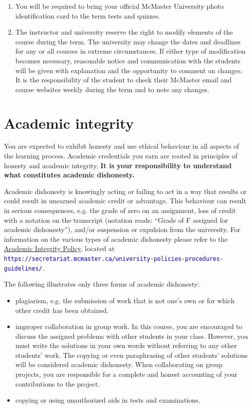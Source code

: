 \documentclass[12pt]{article}
\newcommand{\url}[1]{{\tt\textcolor{blue}{#1}}}
\begin{document}
\begin{center}
\begin{enumerate}
\item You will be required to bring your official McMaster University photo identification card to the term tests and quizzes.

\item The instructor and university reserve the right to modify elements of the course during the term.  The university may change the dates and deadlines for any or all courses in extreme circumstances.  If either type of modification becomes necessary, reasonable notice and communication with the students will be given with explanation and the opportunity to comment on changes.  It is the responsibility of the student to check their McMaster email and course websites weekly during the term and to note any changes.

\end{enumerate}

\section*{Academic integrity}

You are expected to exhibit honesty and use ethical behaviour in all
aspects of the learning process. Academic credentials you earn are
rooted in principles of honesty and academic integrity. \textbf{It is
your responsibility to understand what constitutes academic dishonesty.}

Academic dishonesty is knowingly acting or failing to act in a way that results or could result in unearned academic credit or advantage. This behaviour can result in serious consequences, e.g. the grade of zero on an assignment, loss of credit with a notation on the transcript (notation reads: ``Grade of F assigned for academic dishonesty''), and/or suspension or expulsion from the university. For information on the various types of academic dishonesty please refer to the \href{https://secretariat.mcmaster.ca/app/uploads/Academic-Integrity-Policy-1-1.pdf}{Academic Integrity Policy}, located at \url{https://secretariat.mcmaster.ca/university-policies-procedures-guidelines/}.

The following illustrates only three forms of academic dishonesty:

\begin{itemize}
\item
  plagiarism, e.g. the submission of work that is not one's own or for
  which other credit has been obtained.
\item
  improper collaboration in group work. In this course, you are encouraged to discuss the assigned problems with other students in your class. However, you must write the solutions in your own words without referring to any other students' work. The copying or even paraphrasing of other students' solutions will be considered academic dishonesty. When collaborating on group projects, you are responsible for a complete and honest accounting of your contributions to the project.
\item
  copying or using unauthorized aids in tests and examinations.
\end{itemize}



\end{center}
\end{document}

